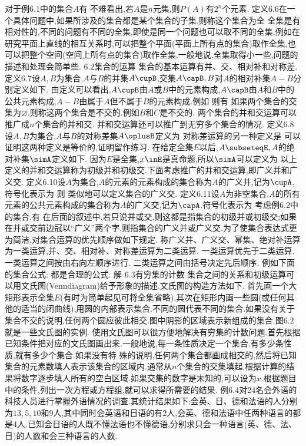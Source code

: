 {对于例$6.1$中的集合$A$有
不难看出,若$A$是$n$元集,则$P(A)$有$2^{n}$个元素.
定义6.6在一个具体问题中,如果所涉及的集合都是某个集合的子集,则称这个集合为全
全集是有相对性的,不同的问题有不同的全集,即使是同一个问题也可以取不同的全集.例如在研究平面上直线的相互关系时,可以把整个平面(平面上所有点的集合)取作全集,也可以把整个空间(空间上所有点的集合)取作全集.一般地说,全集取得小一些,问题的描述和处理会简单些.
{$6.2$集合的运算}
集合的基本运算有并、交、相对补和对称差.
定义$6.7$设$A,B$为集合,$A$与$B$的并集$A\cupB$,交集$A\capB,B$对$A$的相对补集$A-B$分别定义如下.
由定义可以看出,$A\cupB$由$A$或$B$中的元素构成,$A\capB$由$A$和$B$中的公共元素构成,$A-B$由属于$A$但不属于$B$的元素构成.例如
则有
如果两个集合的交集为$\varnothing$,则称这两个集合是不交的.例如$B$和$C$是不交的.
两个集合的并和交运算可以推广成$n$个集合的并和交.
并和交运算还可以推广到无穷多个集合的情况.
定义$6.8$设$A,B$为集合,$A$与$B$的对称差集$A\oplusB$定义为
对称差运算的另一种定义是
可以证明这两种定义是等价的,证明留作练习.
在给定全集$E$以后,$A\subseteqE,A$的绝对补集$\simA$定义如下.
因为$E$是全集,$x\inE$是真命题,所以$\simA$可以定义为
以上定义的并和交运算称为初级并和初级交.下面考虑推广的并和交运算,即广义并和广义交.
定义6.10设$A$为集合,$A$的元素的元素构成的集合称为$A$的广义并,记为$\cupA$,符号化表示为
则
类似地可以定义集合的广义交.
定义6.11设$A$为非空集合,$A$的所有元素的公共元素构成的集合称为$A$的广义交,记为$\capA$.符号化表示为
考虑例$6.2$中的集合,有
在后面的叙述中,若只说并或交,则这都是指集合的初级并或初级交;如果在并或交前边冠以“广义”两个字,则指集合的广义并或广义交.为了使集合表达式更为简洁,对集合运算的优先顺序做如下规定.
称广义并、广义交、幂集、绝对补运算为一类运算,并、交、相对补、对称差运算为二类运算.
一类运算优先于二类运算.
一类运算之间按由右向左顺序进行.
二类运算之间由括号决定先后顺序.
例如下面的集合公式:
都是合理的公式.
解
{$6.3$有穷集的计数}
集合之间的关系和初级运算可以用文氏图(Venndiagram)给予形象的描述.文氏图的构造方法如下.
首先画一个大矩形表示全集$E$(有时为简单起见可将全集省略),其次在矩形内画一些圆(或任何其他的适当的闭曲线),用圆的内部表示集合.不同的圆代表不同的集合.如果没有关于集合不交的说明,任何两个圆应彼此相交.图中阴影的区域表示新组成的集合.图$6.2$就是一些文氏图的实例.
使用文氏图可以很方便地解决有穷集的计数问题.首先根据已知条件把对应的文氏图画出来.一般地说,每一条性质决定一个集合.有多少条性质,就有多少个集合.如果没有特
殊的说明,任何两个集合都画成相交的,然后将已知集合的元素数填人表示该集合的区域内.通常从$n$个集合的交集填起,根据计算的结果将数字逐步填人所有的空白区域.如果交集的数字是末知的,可以设为$x$.根据题目中的条件,列出一次方程或方程组,就可以求得所需要的结果.
例$6.4$对24名会外语的科技人员进行掌握外语情况的调查.其统计结果如下:会英、日、德和法语的人分别为$13,5,10$和9人,其中同时会英语和日语的有2人,会英、德和法语中任两种语言的都是4人.已知会日语的人既不懂法语也不懂德语,分别求只会一种语言(英、德、法、日)的人数和会三种语言的人数.
}
